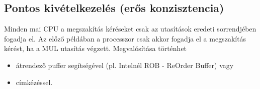\subsection{Pontos kivételkezelés (erős konzisztencia)}
Minden mai CPU a megszakítás kéréseket csak az utasítások eredeti sorrendjében fogadja el.
Az előző példában a processzor csak akkor fogadja el a megszakítás kérést, ha a MUL utasítás végzett.
Megvalósítása történhet
\begin{itemize}
    \item átrendező puffer segítségével (pl. Intelnél ROB - ReOrder Buffer) vagy
    \item címkézéssel.
\end{itemize}